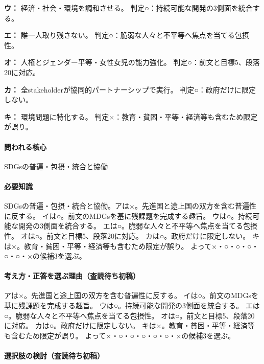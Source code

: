 \noindent\textbf{ウ：} 経済・社会・環境を調和させる。 判定○：持続可能な開発の3側面を統合する。\par

\noindent\textbf{エ：} 誰一人取り残さない。 判定○：脆弱な人々と不平等へ焦点を当てる包摂性。\par

\noindent\textbf{オ：} 人権とジェンダー平等・女性女児の能力強化。 判定○：前文と目標5、段落20に対応。\par

\noindent\textbf{カ：} 全stakeholderが協同的パートナーシップで実行。 判定○：政府だけに限定しない。\par

\noindent\textbf{キ：} 環境問題に特化する。 判定×：教育・貧困・平等・経済等も含むため限定が誤り。\par

\paragraph{問われる核心} SDGsの普遍・包摂・統合と協働

\paragraph{必要知識} SDGsの普遍・包摂・統合と協働。アは×。先進国と途上国の双方を含む普遍性に反する。 イは○。前文のMDGsを基に残課題を完成する趣旨。 ウは○。持続可能な開発の3側面を統合する。 エは○。脆弱な人々と不平等へ焦点を当てる包摂性。 オは○。前文と目標5、段落20に対応。 カは○。政府だけに限定しない。 キは×。教育・貧困・平等・経済等も含むため限定が誤り。 よって×・○・○・○・○・○・×の候補3を選ぶ。

\paragraph{考え方・正答を選ぶ理由（査読待ち初稿）} アは×。先進国と途上国の双方を含む普遍性に反する。 イは○。前文のMDGsを基に残課題を完成する趣旨。 ウは○。持続可能な開発の3側面を統合する。 エは○。脆弱な人々と不平等へ焦点を当てる包摂性。 オは○。前文と目標5、段落20に対応。 カは○。政府だけに限定しない。 キは×。教育・貧困・平等・経済等も含むため限定が誤り。 よって×・○・○・○・○・○・×の候補3を選ぶ。

\paragraph{選択肢の検討（査読待ち初稿）}\mbox{}\par

